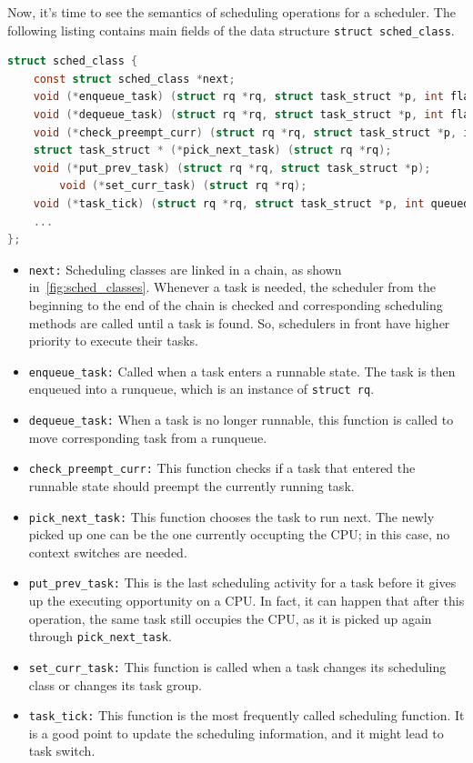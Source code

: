 Now, it's time to see the semantics of scheduling operations for a
scheduler. The following listing contains main fields of 
the data structure \texttt{struct sched\_class}.

\begin{lstlisting}[language=C, 
		caption={Scheduling operations for a scheduler},
		label={lst:sched_class}]
struct sched_class {
	const struct sched_class *next;
	void (*enqueue_task) (struct rq *rq, struct task_struct *p, int flags);
	void (*dequeue_task) (struct rq *rq, struct task_struct *p, int flags);
	void (*check_preempt_curr) (struct rq *rq, struct task_struct *p, int flags);
	struct task_struct * (*pick_next_task) (struct rq *rq);
	void (*put_prev_task) (struct rq *rq, struct task_struct *p);
        void (*set_curr_task) (struct rq *rq);
	void (*task_tick) (struct rq *rq, struct task_struct *p, int queued);
	...
};
\end{lstlisting}
\begin{itemize} 
\item \texttt{next:}
	Scheduling classes are linked in a chain, as shown 
	in~\vref{fig:sched_classes}.  Whenever a task is needed,
	the scheduler from the beginning to the end of the chain 
	is checked and corresponding scheduling methods are called
	until a task is found. So, schedulers in front have higher 
	priority to execute their tasks. 
\item \texttt{enqueue\_task:}
	Called when a task enters a runnable state. The task is then 
	enqueued into a runqueue, which is an instance of \texttt{struct rq}.
\item \texttt{dequeue\_task:}
	When a task is no longer runnable, this function is called to move
	corresponding task from a runqueue.
\item \texttt{check\_preempt\_curr:}
	This function checks if a task that entered the runnable state 
	should preempt the currently running task.
\item \texttt{pick\_next\_task:}
	This function chooses the task to run next. The newly picked up
	one can be the one currently occupting the CPU; in this case,
	no context switches are needed.
\item \texttt{put\_prev\_task:}
	This is the last scheduling activity for a task before it gives
	up the executing opportunity on a CPU. In fact, it can happen
	that after this operation, the same task still occupies the 
	CPU, as it is picked up again through \texttt{pick\_next\_task}.
\item \texttt{set\_curr\_task:}
	This function is called when a task changes its scheduling class
	or changes its task group.
\item \texttt{task\_tick:}
	This function is the most frequently called scheduling function. 
	It is a good point to update the scheduling information, and 
	it might lead to task switch.
\end{itemize} 
